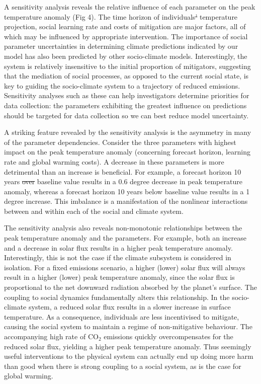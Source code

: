 \documentclass[10pt,letterpaper]{article}
\providecommand{\DIFaddtex}[1]{{\protect\color{blue}\uwave{#1}}} %
\providecommand{\DIFdeltex}[1]{{\protect\color{red}\sout{#1}}}                      %
\providecommand{\DIFaddbegin}{} %
\providecommand{\DIFaddend}{} %
\providecommand{\DIFdelbegin}{} %
\providecommand{\DIFdelend}{} %
\providecommand{\DIFadd}[1]{\texorpdfstring{\DIFaddtex{#1}}{#1}} %
\providecommand{\DIFdel}[1]{\texorpdfstring{\DIFdeltex{#1}}{}} %
\begin{document}
A sensitivity analysis reveals the relative influence of each parameter on the peak temperature anomaly (Fig 4). The time horizon of individuals\DIFdelbegin \DIFdel{’ }\DIFdelend \DIFaddbegin \DIFadd{? }\DIFaddend temperature projection, social learning rate and costs of mitigation are major factors, all of which may be influenced by appropriate intervention. The importance of social parameter uncertainties in determining climate predictions indicated by our model has also been predicted by other socio-climate models\cite{beckage18}. Interestingly, the system is relatively insensitive to the initial proportion of mitigators, suggesting that the mediation of social processes, as opposed to the current social state, is key to guiding the socio-climate system to a trajectory of reduced emissions. Sensitivity analyses such as these can help investigators determine priorities for data collection: the parameters exhibiting the greatest influence on predictions should be targeted for data collection so we can best reduce model uncertainty.

A striking feature revealed by the sensitivity analysis is the asymmetry in many of the parameter dependencies. Consider the three parameters with highest impact on the peak temperature anomaly (concerning forecast horizon, learning rate and global warming costs). A decrease in these parameters is more detrimental than an increase is beneficial. For example, a forecast horizon 10 years \DIFdelbegin \DIFdel{over }\DIFdelend \DIFaddbegin \DIFadd{above }\DIFaddend baseline value results in a 0.6 degree decrease in peak temperature anomaly, whereas a forecast horizon 10 years below baseline value results in a 1 degree increase. This imbalance is a manifestation of the nonlinear interactions between and within each of the social and climate system.

The sensitivity analysis also reveals non-monotonic relationships between the peak temperature anomaly and the parameters. For example, both an increase and a decrease in solar flux results in a higher peak temperature anomaly. Interestingly, this is not the case if the climate subsystem is considered in isolation. For a fixed emissions scenario, a higher (lower) solar flux will always result in a higher (lower) peak temperature anomaly, since the solar flux is proportional to the net downward radiation absorbed by the planet's surface. The coupling to social dynamics fundamentally alters this relationship. In the socio-climate system, a reduced solar flux results in a slower increase in surface temperature. As a consequence, individuals are less incentivised to mitigate, causing the social system to maintain a regime of non-mitigative behaviour. The accompanying high rate of $\text{CO}_2$ emissions quickly overcompensates for the reduced solar flux, yielding a higher peak temperature anomaly. Thus seemingly useful interventions to the physical system can actually end up doing more harm than good when there is strong coupling to a social system, as is the case for global warming.
\end{document}
